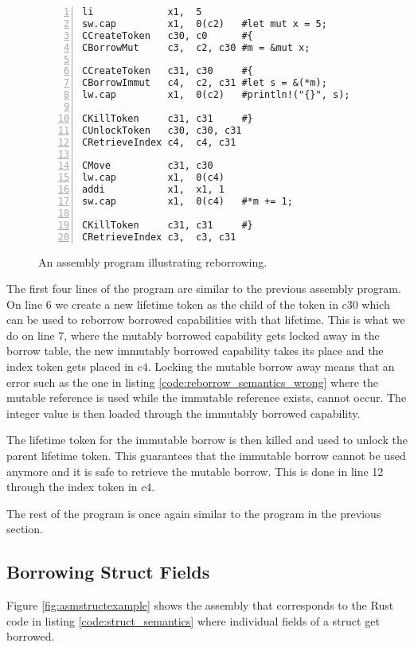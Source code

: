 \begin{figure}[h]
\begin{lstlisting}[style=custASM, numbers = left ,xleftmargin=1.5em]
li             x1,  5
sw.cap         x1,  0(c2)   #let mut x = 5;
CCreateToken   c30, c0      #{
CBorrowMut     c3,  c2, c30 #m = &mut x;

CCreateToken   c31, c30     #{
CBorrowImmut   c4,  c2, c31 #let s = &(*m);
lw.cap         x1,  0(c2)   #println!("{}", s);

CKillToken     c31, c31     #}
CUnlockToken   c30, c30, c31
CRetrieveIndex c4,  c4, c31

CMove          c31, c30
lw.cap         x1,  0(c4)
addi           x1,  x1, 1
sw.cap         x1,  0(c4)   #*m += 1;

CKillToken     c31, c31     #}
CRetrieveIndex c3,  c3, c31
\end{lstlisting}
\caption{An assembly program illustrating reborrowing.}
\label{fig:asmreborrowexample}
\end{figure}

The first four lines of the program are similar to the previous assembly program.
On line 6 we create a new lifetime token as the child of the token in $c30$ which can be used to reborrow borrowed capabilities with that lifetime.
This is what we do on line 7, where the mutably borrowed capability gets locked away in the borrow table, the new immutably borrowed capability takes its place and the index token gets placed in $c4$.
Locking the mutable borrow away means that an error such as the one in listing \ref{code:reborrow_semantics_wrong} where the mutable reference is used while the immutable reference exists, cannot occur.
The integer value is then loaded through the immutably borrowed capability.

The lifetime token for the immutable borrow is then killed and used to unlock the parent lifetime token.
This guarantees that the immutable borrow cannot be used anymore and it is safe to retrieve the mutable borrow.
This is done in line 12 through the index token in $c4$.

The rest of the program is once again similar to the program in the previous section.

\subsection{Borrowing Struct Fields}
Figure \ref{fig:asmstructexample} shows the assembly that corresponds to the Rust code in listing \ref{code:struct_semantics} where individual fields of a struct get borrowed.

